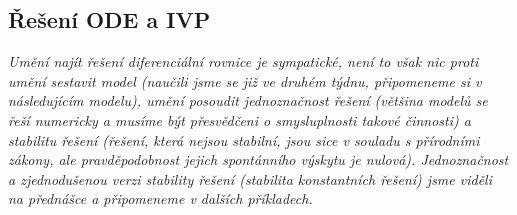\stranka

\subsection{Řešení ODE a IVP} 


\textit{Umění najít řešení diferenciální rovnice je sympatické, není to však nic proti umění sestavit model (naučili jsme se již ve druhém týdnu, připomeneme si v následujícím modelu), umění posoudit jednoznačnost řešení (většina modelů se řeší numericky a musíme být přesvědčeni o smysluplnosti takové činnosti) a  stabilitu řešení (řešení, která nejsou stabilní, jsou sice v souladu s přírodními zákony, ale pravděpodobnost jejich spontánního výskytu je nulová). Jednoznačnost a zjednodušenou verzi stability řešení (stabilita konstantních řešení) jsme viděli na přednášce a připomeneme v dalších příkladech.}

\stranka

\def\priklad #1.{$#1$}

\reseni

